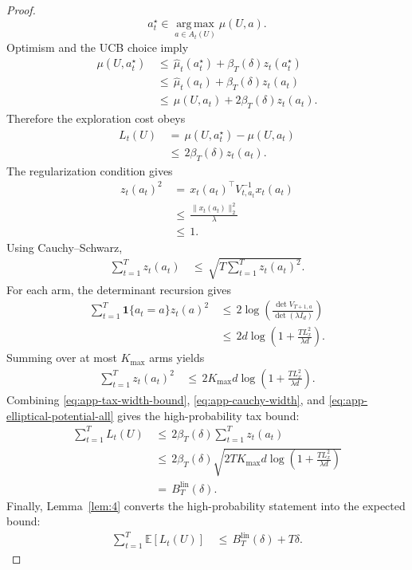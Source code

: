 \documentclass{article} %
\begin{document}
\begin{proof}
\begin{equation}
\label{eq:app-current-oracle-arm}
a_t^\star
\in
\operatorname*{arg\,max}_{a\in A_t(U)}\mu(U,a).
\end{equation}
Optimism and the UCB choice imply
\begin{align}
\label{eq:app-optimism-chain}
\mu(U,a_t^\star)
&\,\le\,
\widehat{\mu}_t(a_t^\star)
+
\beta_T(\delta)z_t(a_t^\star)
\\
&\,\le\,
\widehat{\mu}_t(a_t)
+
\beta_T(\delta)z_t(a_t)
\\
&\,\le\,
\mu(U,a_t)
+
2\beta_T(\delta)z_t(a_t).
\end{align}
Therefore the exploration cost obeys
\begin{align}
\label{eq:app-tax-width-bound}
L_t(U)
&\,=\,
\mu(U,a_t^\star)-\mu(U,a_t)
\\
&\,\le\,
2\beta_T(\delta)z_t(a_t).
\end{align}
The regularization condition gives
\begin{align}
\label{eq:app-width-at-most-one}
z_t(a_t)^2
&\,=\,
x_t(a_t)^\top V_{t,a_t}^{-1}x_t(a_t)
\\
&\,\le\,
\frac{\|x_t(a_t)\|_2^2}{\lambda}
\\
&\,\le\,
1.
\end{align}
Using Cauchy--Schwarz,
\begin{align}
\label{eq:app-cauchy-width}
\sum_{t=1}^{T}z_t(a_t)
&\,\le\,
\sqrt{
T
\sum_{t=1}^{T}z_t(a_t)^2
}.
\end{align}
For each arm, the determinant recursion gives
\begin{align}
\label{eq:app-elliptical-potential-arm}
\sum_{t=1}^{T}
\mathbf{1}\{a_t=a\}z_t(a)^2
&\,\le\,
2
\log\!\left(
\frac{\det V_{T+1,a}}{\det(\lambda I_d)}
\right)
\\
&\,\le\,
2d
\log\!\left(1+\frac{T L_x^2}{\lambda d}\right).
\end{align}
Summing over at most \(K_{\max}\) arms yields
\begin{align}
\label{eq:app-elliptical-potential-all}
\sum_{t=1}^{T}z_t(a_t)^2
&\,\le\,
2K_{\max}d
\log\!\left(1+\frac{T L_x^2}{\lambda d}\right).
\end{align}
Combining \eqref{eq:app-tax-width-bound}, \eqref{eq:app-cauchy-width}, and \eqref{eq:app-elliptical-potential-all} gives the high-probability tax bound:
\begin{align}
\label{eq:app-lin-tax-final}
\sum_{t=1}^{T}L_t(U)
&\,\le\,
2\beta_T(\delta)
\sum_{t=1}^{T}z_t(a_t)
\\
&\,\le\,
2\beta_T(\delta)
\sqrt{
2T K_{\max}d
\log\!\left(1+\frac{T L_x^2}{\lambda d}\right)
}
\\
&\,=\,
B_T^{\mathrm{lin}}(\delta).
\end{align}
Finally, Lemma~\ref{lem:4} converts the high-probability statement into the expected bound:
\begin{align}
\label{eq:app-lin-expected-final}
\sum_{t=1}^{T}\mathbb{E}[L_t(U)]
&\,\le\,
B_T^{\mathrm{lin}}(\delta)+T\delta.
\end{align}
\end{proof}
\end{document}
